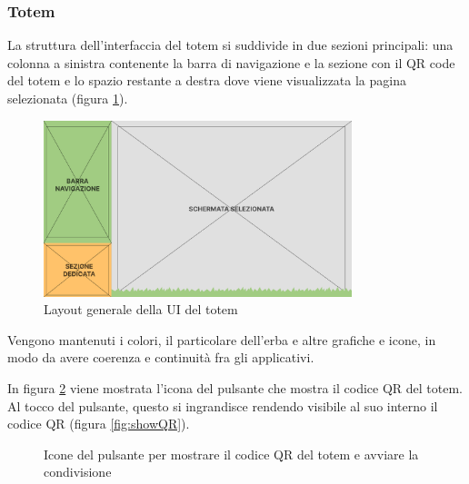 \subsubsection{Totem}
La struttura dell'interfaccia del totem si suddivide in due sezioni principali: una colonna a sinistra contenente la barra di navigazione e la sezione con il QR code del totem e lo spazio restante a destra dove viene visualizzata la pagina selezionata (figura \ref{fig:viewStruct}).
\begin{figure}[h]
    \centering
    \includegraphics[width=0.8\textwidth]{img/totem/mainStructure.png}
    \caption{Layout generale della UI del totem}
    \label{fig:viewStruct}
\end{figure}

Vengono mantenuti i colori, il particolare dell'erba e altre grafiche e icone, in modo da avere coerenza e continuità fra gli applicativi.

In figura \ref{fig:depositIconsQR} viene mostrata l'icona del pulsante che mostra il codice QR del totem. Al tocco del pulsante, questo si ingrandisce rendendo visibile al suo interno il codice QR (figura \ref{fig:showQR}).
\begin{figure}
    \centering
    \vspace{1cm}
    \caption[Icone del QR code nel totem]{Icone del pulsante per mostrare il codice QR del totem e avviare la condivisione}
    \label{fig:depositIconsQR}
\end{figure}

